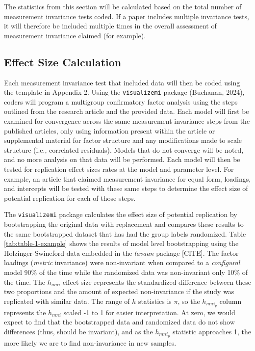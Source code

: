 \documentclass[
  man]{apa7}
\begin{document}
The statistics from this section will be calculated based on the total number of measurement invariance tests coded. If a paper includes multiple invariance tests, it will therefore be included multiple times in the overall assessment of measurement invariance claimed (for example).

\subsection{Effect Size Calculation}\label{effect-size-calculation}

Each measurement invariance test that included data will then be coded using the template in Appendix 2. Using the \texttt{visualizemi} package (Buchanan, 2024), coders will program a multigroup confirmatory factor analysis using the steps outlined from the research article and the provided data. Each model will first be examined for convergence across the same measurement invariance steps from the published articles, only using information present within the article or supplemental material for factor structure and any modifications made to scale structure (i.e., correlated residuals). Models that do not converge will be noted, and no more analysis on that data will be performed. Each model will then be tested for replication effect sizes rates at the model and parameter level. For example, an article that claimed measurement invariance for equal form, loadings, and intercepts will be tested with these same steps to determine the effect size of potential replication for each of those steps.

The \texttt{visualizemi} package calculates the effect size of potential replication by bootstrapping the original data with replacement and compares these results to the same bootstrapped dataset that has had the group labels randomized. Table \ref{tab:table-1-example} shows the results of model level bootstrapping using the Holzinger-Swineford data embedded in the \emph{lavaan} package {[}CITE{]}. The factor loadings (\emph{metric} invariance) were non-invariant when compared to a \emph{configural} model 90\% of the time while the randomized data was non-invariant only 10\% of the time. The \(h_{mni}\) effect size represents the standardized difference between these two proportions and the amount of expected non-invariance if the study was replicated with similar data. The range of \(h\) statistics is \(\pi\), so the \(h_{mni_p}\) column represents the \(h_{mni}\) scaled -1 to 1 for easier interpretation. At zero, we would expect to find that the bootstrapped data and randomized data do not show differences (thus, should be invariant), and as the \(h_{mni_p}\) statistic approaches 1, the more likely we are to find non-invariance in new samples.
\end{document}
